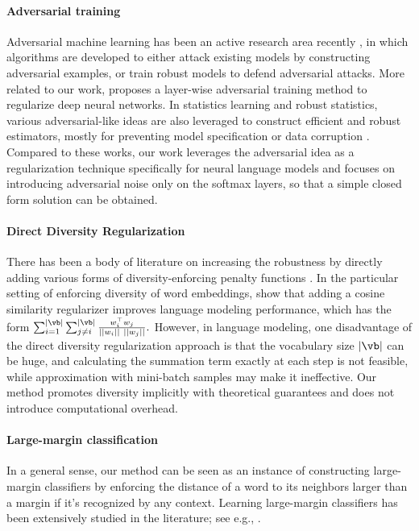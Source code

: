\documentclass{article}
\begin{document}
\paragraph{Adversarial training} 
Adversarial machine learning has been an active 
research area recently \citep{szegedy2013intriguing, goodfellow2015explaining, athalye2018obfuscated},
in which algorithms are developed to 
either attack existing models by constructing adversarial examples, or 
 train robust models to defend adversarial attacks. 
More related to our work, 
\citep{sankaranarayanan2018regularizing} proposes a layer-wise adversarial training method to regularize deep neural networks. 
In statistics learning and robust statistics, 
various adversarial-like ideas are also leveraged to construct efficient and robust estimators, mostly for preventing model specification or data corruption \citep[e.g.,][]{maronna2018robust, duchi2016statistics}.     
Compared to these works, our work  
leverages the adversarial idea
as a regularization technique specifically for neural language models and focuses on introducing adversarial noise only on the softmax layers, so that a simple closed form solution can be obtained.


\paragraph{Direct Diversity Regularization}  There has been a body of literature on
increasing the robustness by 
directly 
adding various forms of diversity-enforcing penalty functions \citep[e.g.,][]{elsayed2018large, xie2016diverse, liu2016large, liu2017sphereface, chen2017noisy, wang2018additive}. In the particular setting of enforcing diversity of word embeddings, 
\citet{gao2018representation} show 
that adding a cosine similarity regularizer improves language modeling performance, which has the form 
$
\sum_{i=1}^{|\vb|}\sum_{j\neq i}^{|\vb|} \frac{w_i^\top w_j }{ ||w_i||~||w_j||}.
$
However, in language modeling, 
one disadvantage of the direct diversity regularization approach  is that 
the vocabulary size $|\vb|$ can be huge, and
calculating the summation term exactly at each step is not feasible, while 
approximation with mini-batch samples may  make it ineffective. Our method promotes diversity implicitly with theoretical guarantees and does not introduce  computational overhead. 






\paragraph{Large-margin classification}
In a general sense, our method can be seen as an instance of
 constructing
 large-margin classifiers by enforcing the distance of a word to its neighbors larger than a margin if it's recognized by any context.
Learning large-margin classifiers has been extensively studied in the literature; 
 see e.g., \citet{weston1999support, tsochantaridis2005large, jiang2018predicting, elsayed2018large, liu2016large, liu2017sphereface}. 
\end{document}
